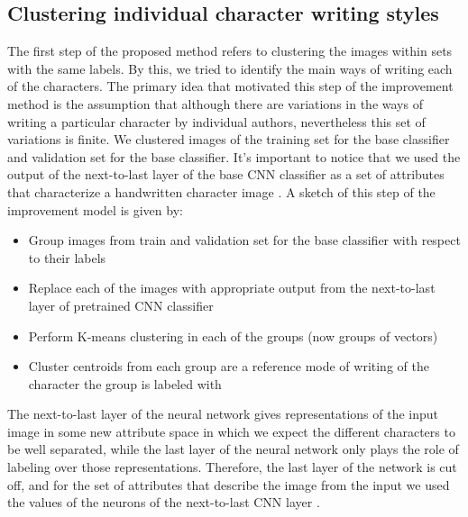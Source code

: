 \documentclass{article}
\begin{document}
\subsection{Clustering individual character writing styles}

The first step of the proposed method refers to clustering the images within sets with the same labels. 
By this, we tried to identify the main ways of writing each of the characters. %
The primary idea that motivated this step of the improvement method is the assumption that although there are variations in the ways of writing a particular 
character by individual authors, nevertheless this set of variations is finite.
We clustered images of the training set for the base classifier and validation set for the base classifier. 
It's important to notice that we used the output of the next-to-last layer of the base CNN classifier as a set of attributes that characterize a handwritten character image \citep{nexttolast}. 
A sketch of this step of the improvement model is given by:
\begin{itemize}
  \item Group images from train and validation set for the base classifier with respect to their labels
  \item Replace each of the images with appropriate output from the next-to-last layer of pretrained CNN classifier
  \item Perform K-means clustering in each of the groups (now groups of vectors)
  \item Cluster centroids from each group are a reference mode of writing of the character the group is labeled with
\end{itemize}

The next-to-last layer of the neural network gives representations of the input image in some new attribute space in which we expect the different characters to be well separated,
while the last layer of the neural network only plays the role of labeling over those representations.
Therefore, the last layer of the network is cut off, and for the set of attributes that describe the image from the input we used the values of the neurons of the next-to-last CNN layer \citep{style1, style2}.
\end{document}

